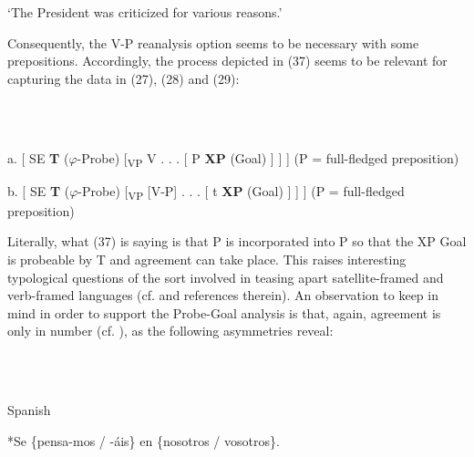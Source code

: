 \documentclass[output=paper]{langsci/langscibook}
\begin{document}
\begin{styleHTMLPreformatted}
         ‘The President was criticized for various reasons.’
\end{styleHTMLPreformatted}

\begin{styleHTMLPreformatted}
Consequently, the V-P reanalysis option seems to be necessary with some prepositions. Accordingly, the process depicted in (37) seems to be relevant for capturing the data in (27), (28) and (29):
\end{styleHTMLPreformatted}

\ea%
    \label{ex:key:37}
    \gll\\
        \\
    \glt
    \z

          a.   [ SE \textbf{T} ($\varphi $-Probe)  [\textsubscript{VP} V . . . [  P \textbf{XP} (Goal) ] ] ] (P = full-fledged preposition)

 

b.   [ SE \textbf{T} ($\varphi $-Probe)  [\textsubscript{VP} [V-P] . . . [ t  \textbf{XP} (Goal) ] ] ] (P = full-fledged preposition)

 
\begin{styleHTMLPreformatted}
Literally, what (37) is saying is that P is incorporated into P so that the XP Goal is probeable by T and agreement can take place. This raises interesting typological questions of the sort involved in teasing apart satellite-framed and verb-framed languages (cf. \citealt{Mateu2012} and references therein). An observation to keep in mind in order to support the Probe-Goal analysis is that, again, agreement is only in number (cf. \citealt{Etxepare2006}), as the following asymmetries reveal:
\end{styleHTMLPreformatted}

\begin{styleHTMLPreformatted}
\ea%
    \label{ex:key:38}
    \gll\\
        \\
    \glt
    \z

          Spanish
\end{styleHTMLPreformatted}

\begin{styleHTMLPreformatted}
*Se \{pensa-mos / -áis\}   en  \{nosotros / vosotros\}.      
\end{styleHTMLPreformatted}
\end{document}
